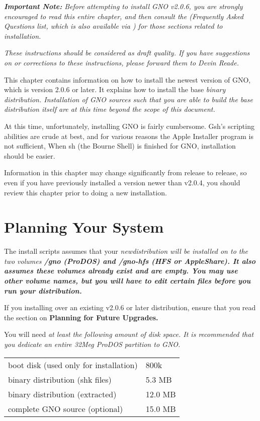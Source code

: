\documentclass{report}
\begin{document}
\em 
\textbf{Important Note:}
Before attempting to install GNO v2.0.6, you are strongly encouraged to 
read this entire chapter, and then consult the 
 (Frequently Asked Questions list, which is also
available via ) for those sections related to installation.
\rm

\em These instructions should be considered as draft quality.  If you
have suggestions on or corrections to these instructions, please forward
them to Devin Reade.\rm

This chapter contains information on how to install the newest version
of GNO, which is version 2.0.6 or later.  It explains how to install
the base \em binary \rm  distribution.  Installation of GNO sources such that
you are able to \em build \rm  the base distribution itself are at this
time beyond the scope of this document.

At this time, unfortunately, installing GNO is fairly cumbersome.
Gsh's scripting abilities are crude at best, and for various reasons
the Apple Installer program is not sufficient,
When sh (the Bourne Shell) is finished for GNO, installation should be easier.

Information in this chapter may change
significantly from release to release, so even if you have previously
installed a version newer than v2.0.4, you should review this chapter
prior to doing a new installation.

\section{Planning Your System}

The install scripts assumes that your \em new\rm  distribution will be 
installed on to the two volumes \bf /gno \rm  (ProDOS) and \bf /gno-hfs \rm 
(HFS or AppleShare).
It also assumes these volumes already exist and are \em empty\rm.
You may use other volume names,
but you will have to edit certain files before you run your distribution.

If you installing over an existing v2.0.6 or later distribution, ensure
that you read the section on \bf Planning for Future Upgrades\rm.

You will need \it at least \rm  the following amount of disk space.  
It is recommended that you dedicate an entire 32Meg ProDOS partition to
GNO.

\begin{tabular}{ll}
boot disk (used only for installation)	& 800k \\
binary distribution (shk files)		& 5.3 MB \\
binary distribution (extracted)		& 12.0 MB \\
complete GNO source (optional)		& 15.0 MB \\
\end{tabular}
\end{document}
